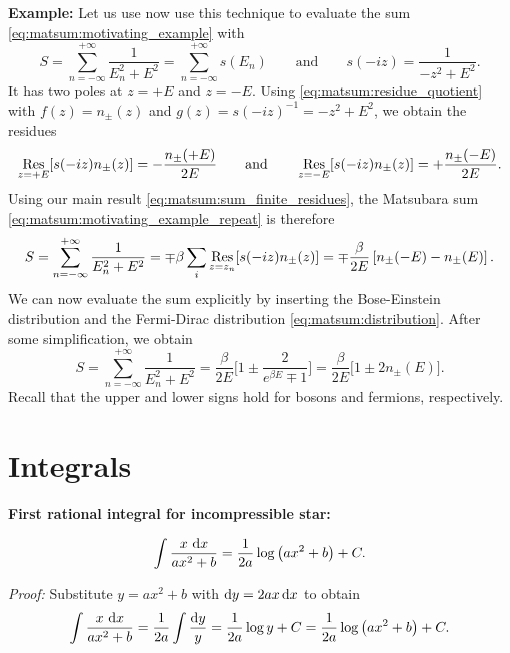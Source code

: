 \textbf{Example:}
Let us use now use this technique to evaluate the sum \eqref{eq:matsum:motivating_example} with
\begin{equation}
	S = \sum_{n=-\infty}^{+\infty} \frac{1}{E_n^2 + E^2}
	  = \sum_{n=-\infty}^{+\infty} s(E_n)
	\qquad \text{and} \qquad
	s(-iz) = \frac{1}{-z^2 + E^2} .
\label{eq:matsum:motivating_example_repeat}
\end{equation}
It has two poles at $z = +E$ and $z = -E$.
Using \cref{eq:matsum:residue_quotient} with $f(z) = n_\pm(z)$ and $g(z) = s(-iz)^{-1} = -z^2 + E^2$, we obtain the residues
\begin{equation}
	\operatorname*{Res}_{z = +E}[s(-iz) n_\pm(z)] = -\frac{n_\pm(+E)}{2 E}  
	\qquad \text{and} \qquad
	\operatorname*{Res}_{z = -E}[s(-iz) n_\pm(z)] = +\frac{n_\pm(-E)}{2 E}  .
\end{equation}
Using our main result \eqref{eq:matsum:sum_finite_residues}, the Matsubara sum \eqref{eq:matsum:motivating_example_repeat} is therefore
\begin{equation}
	S = \sum_{n=-\infty}^{+\infty} \frac{1}{E_n^2 + E^2}
	  = \mp \beta \sum_i \operatorname*{Res}_{z=z_n}[s(-i z) n_\pm(z)]
	  = \mp \frac{\beta}{2 E} \left[ n_\pm(-E) - n_\pm(E) \right] .
\end{equation}
We can now evaluate the sum explicitly by inserting the Bose-Einstein distribution and the Fermi-Dirac distribution \eqref{eq:matsum:distribution}.
After some simplification, we obtain
\begin{equation}
	S = \sum_{n=-\infty}^{+\infty} \frac{1}{E_n^2 + E^2}
	  = \frac{\beta}{2 E} \bigg[ 1 \pm \frac{2}{e^{\beta E} \mp 1} \bigg]
	  = \frac{\beta}{2 E} \bigg[ 1 \pm 2 n_\pm(E) \bigg] .
\label{eq:matsum:example_result}
\end{equation}
Recall that the upper and lower signs hold for bosons and fermions, respectively.

\chapter{Integrals}
\label{chap:integrals}

\newcommand\formulawithcomment[4]{%
\textbf{#1:}
#2
\textit{#3:} #4
}

\newcommand\formulawithproof[3]{\formulawithcomment{#1}{#2}{Proof}{#3}}
\newcommand\formulawithreference[3]{\formulawithcomment{#1}{#2}{Reference}{#3}}

\formulawithproof{First rational integral for incompressible star}{
\begin{equation}
	\int \frac{x \, \mathop{}\!\mathrm{d} x}{ax^2 + b} = \frac{1}{2a} \log \left( a x^2 + b \right) + C .
	\label{eq:integrals:logarithm_xnum}
\end{equation}
}{
	Substitute $y = a x^2 + b$ with $\mathop{}\!\mathrm{d} y = 2 a x \mathop{}\!\mathrm{d} x$ to obtain
	\begin{equation*}
		\int \frac{x \, \mathop{}\!\mathrm{d} x}{ax^2 + b} = \frac{1}{2a} \int \frac{\mathop{}\!\mathrm{d} y}{y} = \frac{1}{2a} \log y + C = \frac{1}{2a} \log \left( a x^2 + b \right) + C .
	\end{equation*}
}

